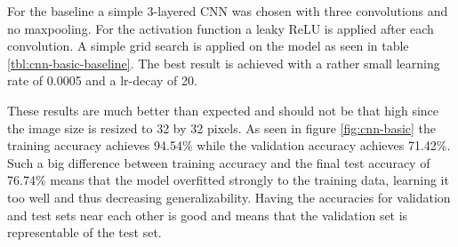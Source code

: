 For the baseline a simple 3-layered CNN was chosen with three convolutions and no maxpooling. For the activation function a leaky ReLU is applied after each convolution. A simple grid search is applied on the model as seen in table \ref{tbl:cnn-basic-baseline}. The best result is achieved with a rather small learning rate of 0.0005 and a lr-decay of 20.

\begin{table}[h]
    \caption{Accuracy (\%) for several learning rates and lr-decays for CNN\_Basic as a baseline.}
    \centering
    \begin{small}
	\textsc{
	}
    \end{small}
    \vspace{-3.9mm}
    \label{tbl:cnn-basic-baseline}
\end{table}

\quad


These results are much better than expected and should not be that high since the image size is resized to 32 by 32 pixels. As seen in figure \ref{fig:cnn-basic} the training accuracy achieves 94.54\% while the validation accuracy achieves 71.42\%. Such a big difference between training accuracy and the final test accuracy of 76.74\% means that the model overfitted strongly to the training data, learning it too well and thus decreasing generalizability. Having the accuracies for validation and test sets near each other is good and means that the validation set is representable of the test set.

